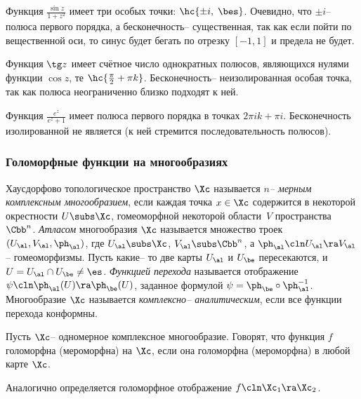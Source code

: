 \documentclass[a4paper]{article}
\begin{document}
\begin{ex}
Функция $\frac{\sin z}{1+z^2}$ имеет три особых точки: $\hc{\pm i, \; \bes}$. Очевидно, что $\pm i$-- полюса
первого порядка, а бесконечность-- существенная, так как если пойти по вещественной оси,
то синус будет бегать по отрезку $[-1, 1]$ и предела не будет.
\end{ex}

\begin{ex}
Функция $\tg z$ имеет счётное число однократных полюсов, являющихся нулями
функции $\cos z$, те $\hc{\frac{\pi}{2} + \pi k}$. Бесконечность-- неизолированная особая точка, так как полюса
неограниченно близко подходят к ней.
\end{ex}

\begin{ex}
Функция $\frac{e^z}{e^z + 1}$ имеет полюса первого порядка в точках $2\pi i k + \pi i$. Бесконечность
изолированной не является (к ней стремится последовательность полюсов).
\end{ex}


\subsubsection{Голоморфные функции на многообразиях}

\begin{df}
Хаусдорфово топологическое пространство $\Xc$ называется \emph{$n$-- мерным комплексным многообразием},
если каждая точка $x \in \Xc$ содержится в некоторой окрестности $U \subs \Xc$, гомеоморфной некоторой
области~$V$ пространства $\Cbb^n$. \emph{Атласом} многообразия $\Xc$ называется множество троек
$(U_\al, V_\al, \ph_\al)$, где $U_\al \subs \Xc$, $V_\al\subs \Cbb^n$, а $\ph_\al\cln U_\al \ra V_\al$-- гомеоморфизмы.
Пусть какие-- то две карты $U_\al$ и $U_\be$ пересекаются, и $U = U_\al \cap U_\be \neq \es$. \emph{Функцией перехода}
называется отображение $\psi\cln \ph_\al(U) \ra \ph_\be(U)$, заданное формулой $\psi = \ph_\be\circ \ph_\al^{-1}$.
Многообразие $\Xc$ называется \emph{комплексно-- аналитическим}, если все функции перехода конформны.
\end{df}

\begin{df}
Пусть $\Xc$-- одномерное комплексное многообразие. Говорят, что функция $f$ голоморфна (мероморфна) на $\Xc$,
если она голоморфна (мероморфна) в любой карте $\Xc$.
\end{df}

Аналогично определяется голоморфное отображение $f\cln\Xc_1 \ra \Xc_2$.
\end{document}
